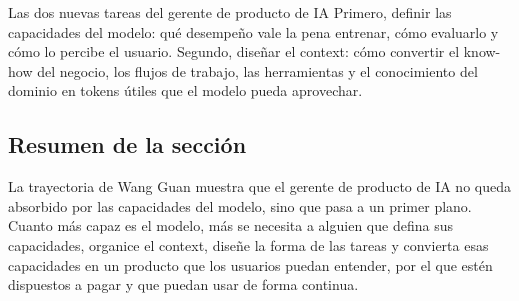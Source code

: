 \begin{importantbox}{Las dos nuevas tareas del gerente de producto de IA}
Primero, definir las capacidades del modelo: qué desempeño vale la pena entrenar, cómo evaluarlo y cómo lo percibe el usuario. Segundo, diseñar el context: cómo convertir el know-how del negocio, los flujos de trabajo, las herramientas y el conocimiento del dominio en tokens útiles que el modelo pueda aprovechar.
\end{importantbox}

\subsection{Resumen de la sección}

La trayectoria de Wang Guan muestra que el gerente de producto de IA no queda absorbido por las capacidades del modelo, sino que pasa a un primer plano. Cuanto más capaz es el modelo, más se necesita a alguien que defina sus capacidades, organice el context, diseñe la forma de las tareas y convierta esas capacidades en un producto que los usuarios puedan entender, por el que estén dispuestos a pagar y que puedan usar de forma continua.
